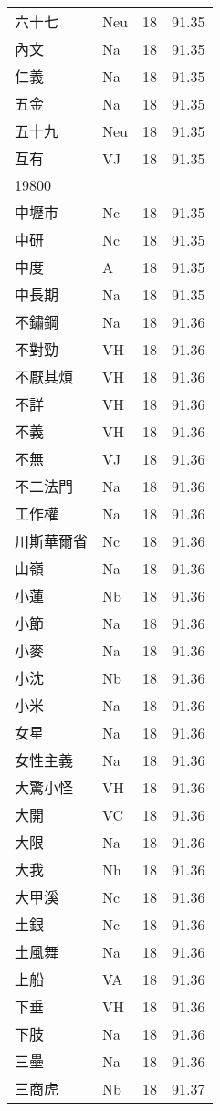 \documentclass[twocolumn]{book}
\begin{document}
\begin{supertabular}{llrr}
六十七 & Neu & 18 &  91.35\\
內文 & Na & 18 &  91.35\\
仁義 & Na & 18 &  91.35\\
五金 & Na & 18 &  91.35\\
五十九 & Neu & 18 &  91.35\\
互有 & VJ & 18 &  91.35\\
19800\\
中壢市 & Nc & 18 &  91.35\\
中研 & Nc & 18 &  91.35\\
中度 & A & 18 &  91.35\\
中長期 & Na & 18 &  91.35\\
不鏽鋼 & Na & 18 &  91.36\\
不對勁 & VH & 18 &  91.36\\
不厭其煩 & VH & 18 &  91.36\\
不詳 & VH & 18 &  91.36\\
不義 & VH & 18 &  91.36\\
不無 & VJ & 18 &  91.36\\
不二法門 & Na & 18 &  91.36\\
工作權 & Na & 18 &  91.36\\
川斯華爾省 & Nc & 18 &  91.36\\
山嶺 & Na & 18 &  91.36\\
小蓮 & Nb & 18 &  91.36\\
小節 & Na & 18 &  91.36\\
小麥 & Na & 18 &  91.36\\
小沈 & Nb & 18 &  91.36\\
小米 & Na & 18 &  91.36\\
女星 & Na & 18 &  91.36\\
女性主義 & Na & 18 &  91.36\\
大驚小怪 & VH & 18 &  91.36\\
大開 & VC & 18 &  91.36\\
大限 & Na & 18 &  91.36\\
大我 & Nh & 18 &  91.36\\
大甲溪 & Nc & 18 &  91.36\\
土銀 & Nc & 18 &  91.36\\
土風舞 & Na & 18 &  91.36\\
上船 & VA & 18 &  91.36\\
下垂 & VH & 18 &  91.36\\
下肢 & Na & 18 &  91.36\\
三壘 & Na & 18 &  91.36\\
三商虎 & Nb & 18 &  91.37\\

\end{supertabular}
\end{document}

